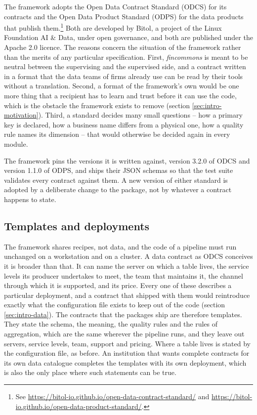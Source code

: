 \documentclass[a4paper, 11pt]{report}
\begin{document}
The framework adopts the Open Data Contract Standard (ODCS) for its contracts and the Open Data Product Standard (ODPS) for the data products that publish them.\footnote{See \url{https://bitol-io.github.io/open-data-contract-standard/} and \url{https://bitol-io.github.io/open-data-product-standard/}.} Both are developed by Bitol, a project of the Linux Foundation AI \& Data, under open governance, and both are published under the Apache 2.0 licence. The reasons concern the situation of the framework rather than the merits of any particular specification. First, \emph{fincommons} is meant to be neutral between the supervising and the supervised side, and a contract written in a format that the data teams of firms already use can be read by their tools without a translation. Second, a format of the framework's own would be one more thing that a recipient has to learn and trust before it can use the code, which is the obstacle the framework exists to remove (section \ref{sec:intro-motivation}). Third, a standard decides many small questions -- how a primary key is declared, how a business name differs from a physical one, how a quality rule names its dimension -- that would otherwise be decided again in every module.

The framework pins the versions it is written against, version 3.2.0 of ODCS and version 1.1.0 of ODPS, and ships their JSON schemas so that the test suite validates every contract against them. A new version of either standard is adopted by a deliberate change to the package, not by whatever a contract happens to state.

\subsection{Templates and deployments}

The framework shares recipes, not data, and the code of a pipeline must run unchanged on a workstation and on a cluster. A data contract as ODCS conceives it is broader than that. It can name the server on which a table lives, the service levels its producer undertakes to meet, the team that maintains it, the channel through which it is supported, and its price. Every one of these describes a particular deployment, and a contract that shipped with them would reintroduce exactly what the configuration file exists to keep out of the code (section \ref{sec:intro-data}). The contracts that the packages ship are therefore templates. They state the schema, the meaning, the quality rules and the rules of aggregation, which are the same wherever the pipeline runs, and they leave out servers, service levels, team, support and pricing. Where a table lives is stated by the configuration file, as before. An institution that wants complete contracts for its own data catalogue completes the templates with its own deployment, which is also the only place where such statements can be true.
\end{document}
